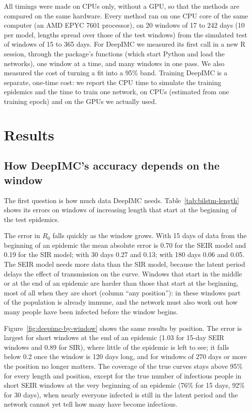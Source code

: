 \documentclass[12pt]{article}
\begin{document}
All timings were made on CPUs only, without a GPU, so that the methods are compared on the same
hardware. Every method ran on one CPU core of the same computer (an AMD EPYC 7601 processor), on 20
windows of 17 to 242 days (10 per model, lengths spread over those of the test windows) from the simulated
test of windows of 15 to 365 days. For DeepIMC we measured its first
call in a new R session, through the package's functions (which start Python and load the networks), one
window at a time, and many windows in one pass. We also measured
the cost of turning a fit into a 95\% band. Training DeepIMC is a separate, one-time cost: we report the
CPU time to simulate the training epidemics and the time to train one network, on CPUs (estimated from
one training epoch) and on the GPUs we actually used.

\section{Results}\label{sec:results}

\subsection{How DeepIMC's accuracy depends on the window}\label{sec:res-bilstm}

The first question is how much data DeepIMC needs. Table~\ref{tab:bilstm-length} shows its errors on
windows of increasing length that start at the beginning of the test epidemics.

The error in $R_0$ falls quickly as the window grows. With 15 days of data from the beginning of an
epidemic the mean absolute error is 0.70 for the SEIR model and 0.19 for the SIR model; with 30 days 0.27 and
0.13; with 180 days 0.06 and 0.05. The SEIR model needs more data than the SIR model, because the latent period
delays the effect of transmission on the curve. Windows that start in the middle or at the end of an epidemic
are harder than those that start at the beginning, most of all when they are short (column ``any position''):
in these windows part of the population is already immune, and the network must also work out how many people
have been infected before the window begins.

Figure~\ref{fig:deepimc-by-window} shows the same results by position. The error is largest for short windows
at the end of an epidemic (1.03 for 15-day SEIR windows and 0.89 for SIR), where little of the epidemic is left
to see; it falls below 0.2 once the window is 120 days long, and for windows of 270 days or more the position no
longer matters. The coverage of the true curves stays above 95\% for every length and position, except for the
true number of infectious people in short SEIR windows at the very beginning of an epidemic (76\% for 15 days,
92\% for 30 days), when nearly everyone infected is still in the latent period and the network cannot yet tell
how many have become infectious.
\end{document}
